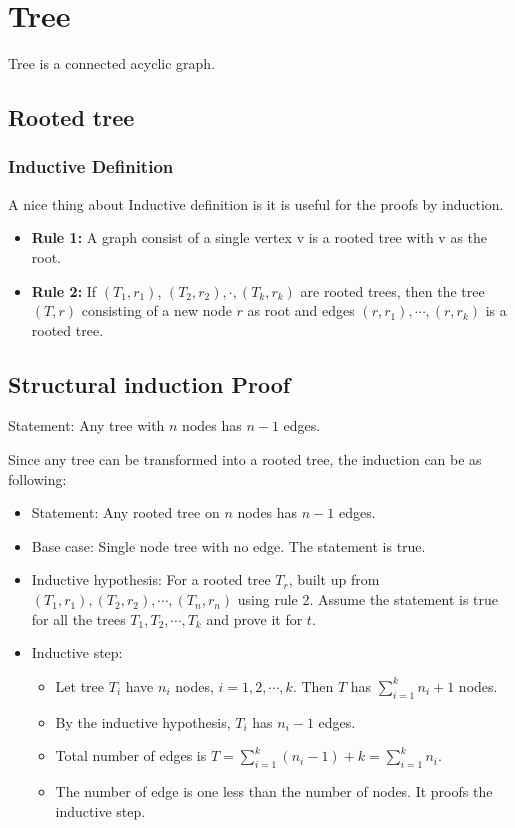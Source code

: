 \documentclass[en,hazy,blue,screen,14pt]{elegantnote}
\begin{document}
\section{Tree}
Tree is a connected acyclic graph.
\subsection{Rooted tree}
\subsubsection{Inductive Definition}
A nice thing about Inductive definition is it is useful for the proofs by 
induction.
\begin{itemize}
 \item \textbf{Rule 1:} A graph consist of a single vertex v is a rooted tree 
with v as the root.
 \item \textbf{Rule 2:} If $(T_1, r_1)$, $(T_2, r_2), \cdot, (T_k, r_k)$ are 
rooted trees, then the tree $(T, r)$ consisting of a new node $r$ as root and 
edges $(r, r_1), \cdots, (r, r_k)$ is a rooted tree.
\end{itemize}
\subsection{Structural induction Proof}
Statement: Any tree with $n$ nodes has $n-1$ edges.

Since any tree can be transformed into a rooted tree, the induction can be as 
following:
\begin{itemize}
 \item Statement: Any rooted tree on $n$ nodes has $n-1$ edges.
 \item Base case: Single node tree with no edge. The statement is true.
 \item Inductive hypothesis: For a rooted tree $T_r$, built up from $(T_1, 
r_1), (T_2, r_2), \cdots, (T_n, r_n)$ using rule 2. Assume the statement is 
true for all the trees $T_1, T_2, \cdots, T_k$ and prove it for $t$.
\item Inductive step:
    \begin{itemize}
    \item Let tree $T_i$ have $n_i$ nodes, $i = 1, 2, \cdots, k$. Then $T$ has 
    $\sum_{i=1}^k n_i + 1$ nodes.
    \item By the inductive hypothesis, $T_i$ has $n_i - 1$ edges.
    \item Total number of edges is $T = \sum_{i=1}^k (n_i - 1) + k = 
\sum_{i=1}^k 
    n_i$.
    \item The number of edge is one less than the number of nodes. It proofs 
the     inductive step.
    \end{itemize}
 \end{itemize}
\end{document}
